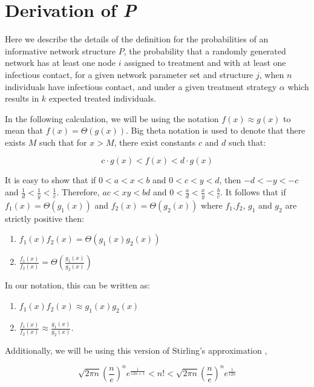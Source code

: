 \documentclass{article}
\theoremstyle{definition}
\begin{document}
\newpage



\newpage


\appendix
{}
\section{\textbf{Derivation of  \textit{P}}}
\label{Appendix 1}
Here we describe the details of the definition for the probabilities of an informative network structure $P$, the probability that a randomly generated network has at least one node $i$ assigned to treatment and with at least one infectious contact, for a given network parameter set and structure $j$, when $n$ individuals have infectious contact, and under a given treatment strategy $\alpha$ which results in $k$ expected treated individuals.

In the following calculation, we will be using the notation $f(x)\approx g(x)$ to mean that $f(x)=\Theta(g(x))$. Big theta notation is used to denote that there exists $M$ such that for $x>M$, there exist constants $c$ and $d$ such that:

 $$c\cdot g(x)< f(x) < d \cdot g(x) $$

It is easy to show that if $0<a<x<b$ and $0<c<y<d$, then $-d<-y<-c$ and $\frac{1}{d}<\frac{1}{y}<\frac{1}{c}$.  Therefore, $ac<xy<bd$ and $0<\frac{a}{d}<\frac{x}{y}<\frac{b}{c}$. It follows that if $f_1(x)=\Theta{\left(g_1(x)\right)}$ and $f_2(x)=\Theta{\left(g_2(x)\right)}$ where $f_1$,$f_2$, $g_1$ and $g_2$ are strictly positive then:
\begin{enumerate}
\item $f_1(x)f_2(x)=\Theta{\left(g_1(x)g_2(x)\right)}$
\item $\frac{f_1(x)}{f_2(x)}=\Theta{\left(\frac{g_1(x)}{g_2(x)}\right)}$
\end{enumerate}

\noindent In our notation, this can be written as:
\begin{enumerate}
     \item $f_1(x)f_2(x)\approx g_1(x)g_2(x)$ 
     \item $\displaystyle\frac{f_1(x)}{f_2(x)}\approx \frac{g_1(x)}{g_2(x)}$.
\end{enumerate}


\noindent Additionally, we will be using this version of Stirling's approximation \cite{robbins_remark_1955, zwillinger_6214_2002},

\begin{equation}
    \sqrt{2\pi n}\left(\frac{n}{e}\right)^{n}e^{\frac{1}{12n+1}} < n! < \sqrt{2\pi n}\left(\frac{n}{e}\right)^{n}e^{\frac{1}{12n}} \nonumber
\end{equation}
\end{document}
